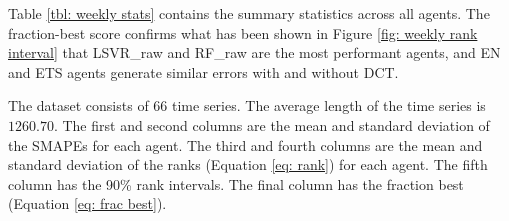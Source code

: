 Table \ref{tbl: weekly stats} contains the summary statistics across all agents. The fraction-best score confirms what has been shown in Figure \ref{fig: weekly rank interval} that LSVR\_raw and RF\_raw are the most performant agents, and EN and ETS agents generate similar errors with and without DCT.
\begin{table}[H]
    \caption{Summary statistics of all agents on weekly financial time series}
    {\raggedright \footnotesize The dataset consists of $66$ time series. The average length of the time series is $1260.70$. The first and second columns are the mean and standard deviation of the SMAPEs for each agent. The third and fourth columns are the mean and standard deviation of the ranks (Equation \ref{eq: rank}) for each agent. The fifth column has the 90\% rank intervals. The final column has the fraction best (Equation \ref{eq: frac best}). \par}
    \label{tbl: weekly stats}
\end{table}


